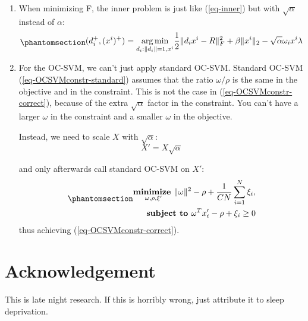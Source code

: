 \documentclass[
  letterpaper,
  DIV=11,
  numbers=noendperiod]{scrartcl}
\begin{document}
\begin{enumerate}
\def\labelenumi{\arabic{enumi}.}
\item
  When minimizing F, the inner problem is just like (\ref{eq-inner}) but
  with \(\sqrt{\alpha}\) instead of \(\alpha\):
  \begin{equation}\phantomsection\label{eq-inner2}{
    \begin{align}
    (d^+_i,(x^i)^+) = \underset{d_i: \|d_i\|=1,x^i}{\arg\min} \frac12\|d_ix^i - R\|_F^2  + \beta\|x^i\|_2 - \sqrt{\alpha} \omega_i x^i\lambda
    \end{align}
    }\end{equation}
\item
  For the OC-SVM, we can't just apply standard OC-SVM. Standard OC-SVM
  (\ref{eq-OCSVMconstr-standard}) assumes that the ratio
  \(\omega / \rho\) is the same in the objective and in the constraint.
  This is not the case in (\ref{eq-OCSVMconstr-correct}), because of the
  extra \(\sqrt{\alpha}\) factor in the constraint. You can't have a
  larger \(\omega\) in the constraint and a smaller \(\omega\) in the
  objective.

  Instead, we need to scale \(X\) with \(\sqrt{\alpha}\):
  \[X' = X \sqrt{\alpha}\]

  and only afterwards call standard OC-SVM on \(X'\):
  \begin{equation}\phantomsection\label{eq-OCSVMconstr-scaled}{
    \begin{align}
    \underset{\omega, \rho, \xi'}{\textbf{minimize  }} \|\omega\|^2 - \rho + \frac{1}{CN} \sum_{i=1}^{N} \xi_i, \\
    \textbf{subject to  } \omega^T x_i' - \rho + \xi_i \geq 0\\
    \end{align}
    }\end{equation} thus achieving (\ref{eq-OCSVMconstr-correct}).
\end{enumerate}

\section{Acknowledgement}\label{acknowledgement}

This is late night research. If this is horribly wrong, just attribute
it to sleep deprivation.
\end{document}
